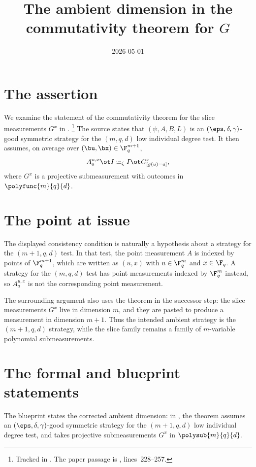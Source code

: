 \documentclass{article}
\title{The ambient dimension in the commutativity theorem for $G$}
\author{}
\date{2026-05-01}
\begin{document}
\maketitle

\section{The assertion}

We examine the statement of the commutativity theorem for the slice
measurements $G^x$ in \cite[Section~\emph{Commutativity of~$G$}]{Ji2020LowIndividualDegree}.%
\footnote{Tracked in . The paper passage is
, lines~228--257.}
The source states that $(\psi,A,B,L)$ is an
$(\eps,\delta,\gamma)$-good symmetric strategy for the $(m,q,d)$ low
individual degree test. It then assumes, on average over
$(\bu,\bx) \in \F_q^{m+1}$,
\[
  A^{u,x}_a \ot I \simeq_\zeta I \ot G^x_{[g(u)=a]},
\]
where $G^x$ is a projective submeasurement with outcomes in
$\polyfunc{m}{q}{d}$.

\section{The point at issue}

The displayed consistency condition is naturally a hypothesis about a
strategy for the $(m+1,q,d)$ test. In that test, the point measurement
$A$ is indexed by points of $\F_q^{m+1}$, which are written as
$(u,x)$ with $u\in\F_q^m$ and $x\in\F_q$. A strategy for the
$(m,q,d)$ test has point measurements indexed by $\F_q^m$ instead, so
$A^{u,x}_a$ is not the corresponding point measurement.

The surrounding argument also uses the theorem in the successor step:
the slice measurements $G^x$ live in dimension $m$, and they are pasted
to produce a measurement in dimension $m+1$. Thus the intended ambient
strategy is the $(m+1,q,d)$ strategy, while the slice family remains a
family of $m$-variable polynomial submeasurements.

\section{The formal and blueprint statements}

The blueprint states the corrected ambient dimension: in
, the theorem
 assumes an $(\eps,\delta,\gamma)$-good symmetric
strategy for the $(m+1,q,d)$ low individual degree test, and takes
projective submeasurements $G^x$ in $\polysub{m}{q}{d}$.
\end{document}
